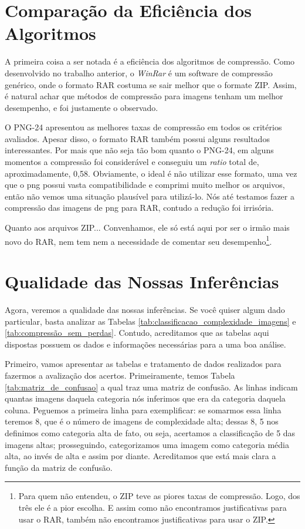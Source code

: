 \newpage
\section{Comparação da Eficiência dos Algoritmos}
A primeira coisa a ser notada é a eficiência dos algoritmos de compressão. Como desenvolvido no trabalho anterior, o \textit{WinRar} é um software de compressão genérico, onde o formato RAR costuma se sair melhor que o formate ZIP. Assim, é natural achar que métodos de compressão para imagens tenham um melhor desempenho, e foi justamente o observado.

\hspace{1.5 cm} O PNG-24 apresentou as melhores taxas de compressão em todos os critérios avaliados. Apesar disso, o formato RAR também possui alguns resultados interessantes. Por mais que não seja tão bom quanto o PNG-24, em alguns momentos a compressão foi considerável e conseguiu um \textit{ratio} total de, aproximadamente, 0,58. Obviamente, o ideal é não utilizar esse formato, uma vez que o png possui vasta compatibilidade e comprimi muito melhor os arquivos, então não vemos uma situação plausível para utilizá-lo. Nós até testamos fazer a compressão das imagens de png para RAR, contudo a redução foi irrisória.

\hspace{1.5 cm} Quanto aos arquivos ZIP... Convenhamos, ele só está aqui por ser o irmão mais novo do RAR, nem tem nem a necessidade de comentar seu desempenho\footnote{Para quem não entendeu, o ZIP teve as piores taxas de compressão. Logo, dos três ele é a pior escolha. E assim como não encontramos justificativas para usar o RAR, também não encontramos justificativas para usar o ZIP.}.

\section{Qualidade das Nossas Inferências}
Agora, veremos a qualidade das nossas inferências. Se você quiser algum dado particular, basta analizar as Tabelas \ref{tab:classificacao_complexidade_imagens} e \ref{tab:compressão_sem_perdas}. Contudo, acreditamos que as tabelas aqui dispostas possuem os dados e informações necessárias para a uma boa análise.

\paragrafo Primeiro, vamos apresentar as tabelas e tratamento de dados realizados para fazermos a avalização dos acertos. Primeiramente, temos Tabela \ref{tab:matriz_de_confusao} a qual traz uma matriz de confusão. As linhas indicam quantas imagens daquela categoria nós inferimos que era da categoria daquela coluna. Peguemos a primeira linha para exemplificar: se somarmos essa linha teremos 8, que é o número de imagens de  complexidade alta; dessas 8, 5 nos definimos como categoria alta de fato, ou seja, acertamos a classificação de 5 das imagens altas; prosseguindo, categorizamos uma imagem como categoria média alta, ao invés de alta e assim por diante. Acreditamos que está mais clara a função da matriz de confusão.

